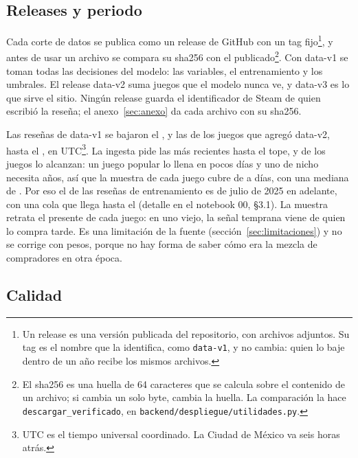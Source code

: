 \subsection{Releases y periodo}\label{sec:datos-releases}\label{sec:datos-periodo}

Cada corte de datos se publica como un release de GitHub con un tag fijo\footnote{Un release es
una versión publicada del repositorio, con archivos adjuntos. Su tag es el nombre que la
identifica, como \texttt{data-v1}, y no cambia: quien lo baje dentro de un año recibe los mismos
archivos.}, y antes de usar un archivo se compara su sha256 con el publicado\footnote{El sha256 es
una huella de 64 caracteres que se calcula sobre el contenido de un archivo; si cambia un solo
byte, cambia la huella. La comparación la hace \texttt{descargar\_verificado}, en
\texttt{backend/despliegue/utilidades.py}.}. Con data-v1 se toman todas las decisiones del modelo:
las variables, el entrenamiento y los umbrales. El release data-v2 suma \cifraJuegosExternos{}
juegos que el modelo nunca ve, y data-v3 es lo que sirve el sitio. Ningún release guarda el
identificador de Steam de quien escribió la reseña; el anexo~\ref{sec:anexo} da cada archivo con
su sha256.

Las reseñas de data-v1 se bajaron el \cifraDescargaHastaEntrenamiento{}, y las de los juegos que
agregó data-v2, hasta el \cifraDescargaHastaCatalogo{}, en UTC\footnote{UTC es el tiempo universal
coordinado. La Ciudad de México va seis horas atrás.}. La ingesta pide las más recientes hasta el
tope, y \cifraJuegosEnElTope{} de los \cifraJuegosEntrenamiento{} juegos lo alcanzan: un juego
popular lo llena en pocos días y uno de nicho necesita años, así que la muestra de cada juego
cubre de \cifraDiasCubiertosMin{} a \cifraDiasCubiertosMax{} días, con una mediana de
\cifraDiasCubiertosMediana{}. Por eso el \cifraDesdeJulioEntrenamientoPorResena{} de las reseñas
de entrenamiento es de julio de 2025 en adelante, con una cola que llega hasta el
\cifraResenaMasAntiguaEntrenamiento{} (detalle en el notebook 00, §3.1). La muestra retrata el
presente de cada juego: en uno viejo, la señal temprana viene de quien lo compra tarde. Es una
limitación de la fuente (sección~\ref{sec:limitaciones}) y no se corrige con pesos, porque no hay
forma de saber cómo era la mezcla de compradores en otra época.

\subsection{Calidad}\label{sec:datos-calidad}

